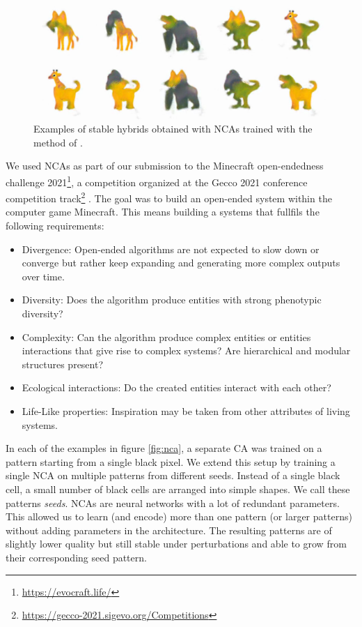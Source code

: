 \begin{figure}[htbp]
  \centering
  \includegraphics[width=.8\linewidth]{figures/nca_hybrids.png}
  \caption{Examples of stable hybrids obtained with \acp{NCA} trained with the
    method of \parencite{cisnerosOpenendedCreationHybrid2021}.}
  \label{fig:nca_hybrid}
\end{figure}


We used \acp{NCA} as part of our submission to the Minecraft open-endedness
challenge 2021\footnote{\url{https://evocraft.life/}}, a competition organized
at the Gecco 2021 conference competition
track\footnote{\url{https://gecco-2021.sigevo.org/Competitions}}
\parencite{cisnerosOpenendedCreationHybrid2021}. The goal was to build an
open-ended system within the computer game Minecraft. This means building a
systems that fullfils the following requirements:

\begin{itemize}
  \item Divergence: Open-ended algorithms are not expected to slow down or
        converge but rather keep expanding and generating more complex outputs
        over time.

  \item Diversity: Does the algorithm produce entities with strong phenotypic
        diversity?

  \item Complexity: Can the algorithm produce complex entities or entities
        interactions that give rise to complex systems? Are hierarchical and
        modular structures present?

  \item Ecological interactions: Do the created entities interact with each
        other?

  \item Life-Like properties: Inspiration may be taken from other attributes of
        living systems.
\end{itemize}

In each of the examples in figure \ref{fig:nca}, a separate \ac{CA} was trained
on a pattern starting from a single black pixel. We extend this setup by
training a single \ac{NCA} on multiple patterns from different seeds. Instead of
a single black cell, a small number of black cells are arranged into simple
shapes. We call these patterns \emph{seeds}. \acp{NCA} are neural networks with a
lot of redundant parameters. This allowed us to learn (and encode) more than one
pattern (or larger patterns) without adding parameters in the architecture. The
resulting patterns are of slightly lower quality but still stable under
perturbations and able to grow from their corresponding seed pattern.

